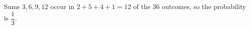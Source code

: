 Sums $3,6,9,12$ occur in $2+5+4+1=12$ of the $36$ outcomes, so the probability is $\boxed{\dfrac13}$.

